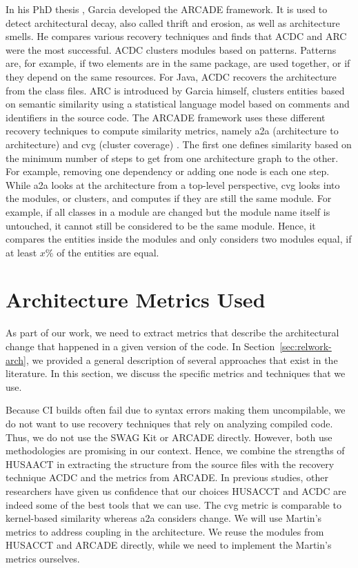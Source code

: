 \documentclass[sigconf, anonymous, review]{acmart}
\begin{document}
In his PhD thesis \cite{arcade-thesis}, Garcia developed the ARCADE framework. It is used to detect architectural decay, also called thrift and erosion, as well as architecture smells. He compares various recovery techniques \cite{arcRec-comparison} and finds that ACDC \cite{ACDC} and ARC were the most successful. 
ACDC clusters modules based on patterns. Patterns are, for example, if two elements are in the same package, are used together, or if they depend on the same resources. For Java, ACDC recovers the architecture from the class files. ARC is introduced by Garcia himself, clusters entities based on semantic similarity using a statistical language model based on comments and identifiers in the source code.
The ARCADE framework uses these different recovery techniques to compute similarity metrics, namely a2a (architecture to architecture) and cvg (cluster coverage) \cite{Arcade}. 
The first one defines similarity based on the minimum number of steps to get from one architecture graph to the other. For example, removing one dependency or adding one node is each one step. While a2a looks at the architecture from a top-level perspective, cvg looks into the modules, or clusters, and computes if they are still the same module. For example, if all classes in a module are changed but the module name itself is untouched, it cannot still be considered to be the same module. Hence, it compares the entities inside the modules and only considers two modules equal, if at least $x \%$ of the entities are equal.

\section{Architecture Metrics Used} \label{sec:Metrics}

As part of our work, we need to extract metrics that describe the architectural change that happened in a given version of the code. 
In Section~\ref{sec:relwork-arch}, we provided a general description of several approaches that exist in the literature.
In this section, we discuss the specific metrics and techniques that we use.

Because CI builds often fail due to syntax errors making them uncompilable, we do not want to use recovery techniques that rely on analyzing compiled code. Thus, we do not use the SWAG Kit or ARCADE directly.
However, both use methodologies are promising in our context. Hence, we combine the strengths of HUSAACT in extracting the structure from the source files with the recovery technique ACDC and the metrics from ARCADE. 
In previous studies, other researchers \cite{MScSteffen, arcRec-comparison} have given us confidence that our choices HUSACCT and ACDC are indeed some of the best tools that we can use.
The cvg metric is comparable to kernel-based similarity whereas a2a considers change. We will use Martin's metrics to address coupling in the architecture. We reuse the modules from HUSACCT and ARCADE directly, while we need to implement the Martin's metrics ourselves. 
\end{document}
